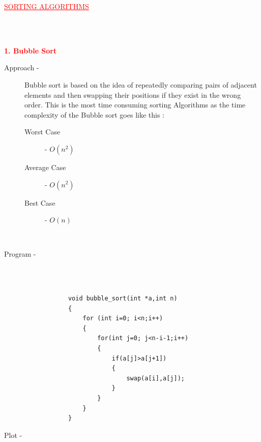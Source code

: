 \documentclass[0pt]{article}
\begin{document}
	\begin{center}
		\begin{LARGE}
			\textcolor{red}{\underline{SORTING ALGORITHMS}}
		\end{LARGE}
		\\
		\leavevmode \\
	\end{center}
	\begin{flushleft}
		\textbf{\textcolor{red}{1. Bubble Sort}}
		\leavevmode \\
		\begin{description}
			\item[Approach - ] Bubble sort is based on the idea of repeatedly comparing pairs of adjacent elements and then swapping their positions if they exist in the wrong order. This is the most time consuming sorting Algorithms as the time complexity of the Bubble sort goes like this :  
			\leavevmode \\
			\begin{description}
				\item[Worst Case] - \(O(n^2)\)
				\item[Average Case] - \(O(n^2)\)
				\item[Best Case] - \(O(n)\)
			\end{description}
			\leavevmode \\
			\item[Program - ] \leavevmode \\
			\leavevmode \\
			\begin{lstlisting}
			void bubble_sort(int *a,int n)
			{
				for (int i=0; i<n;i++)
				{
					for(int j=0; j<n-i-1;i++)
					{
						if(a[j]>a[j+1])
						{
							swap(a[i],a[j]);
						}
					}
				}
			}
			\end{lstlisting}
			\item[Plot - ] \leavevmode \\
		\end{description}
	\end{flushleft}
	\begin{center}
	\end{center}
	\leavevmode \\
	
\end{document}

